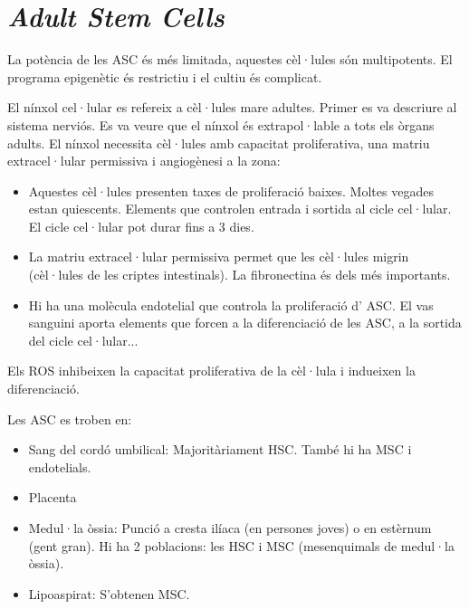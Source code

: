 \section{\textit{Adult Stem Cells}}

La potència de les ASC és més limitada, aquestes cèl·lules són multipotents. El
programa epigenètic és restrictiu i el cultiu és complicat.

El nínxol cel·lular es refereix a cèl·lules mare adultes. Primer es va
descriure al sistema nerviós. Es va veure que el nínxol és
extrapol·lable a tots els òrgans adults. El nínxol necessita cèl·lules
amb capacitat proliferativa, una matriu extracel·lular permissiva i angiogènesi a la zona:
\begin{itemize}
\item Aquestes cèl·lules presenten taxes de proliferació
  baixes. Moltes vegades estan quiescents. Elements que controlen
  entrada i sortida al cicle cel·lular. El cicle cel·lular pot durar fins a 3 dies.

\item La matriu extracel·lular permissiva permet que les cèl·lules
  migrin (cèl·lules de les criptes intestinals). La fibronectina és dels més importants.

\item Hi ha una molècula endotelial que controla la proliferació d'
  ASC. El vas sanguini aporta elements que forcen a la diferenciació
  de les ASC, a la sortida del cicle cel·lular...
\end{itemize}

Els ROS inhibeixen la capacitat proliferativa de la cèl·lula i indueixen la diferenciació.

Les ASC es troben en:
\begin{multicols}{2}
  \begin{itemize}
  \item Sang del cordó umbilical: Majoritàriament HSC. També hi ha MSC i endotelials.
  \item Placenta
  \item Medul·la òssia: Punció a cresta ilíaca (en persones joves) o
    en estèrnum (gent gran). Hi ha 2 poblacions: les HSC i MSC
    (mesenquimals de medul·la òssia).
  \item Lipoaspirat: S'obtenen MSC.
  \end{itemize}
\end{multicols}

